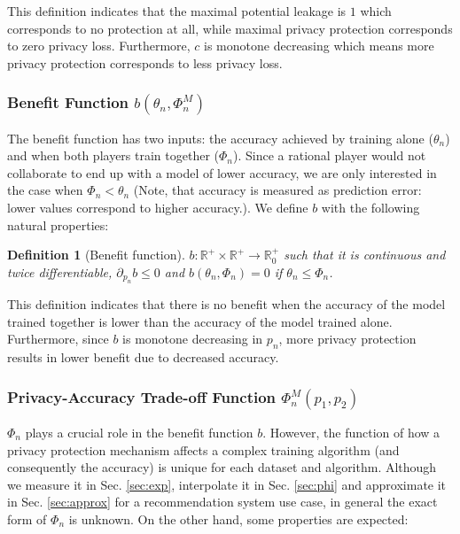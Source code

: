 \documentclass[USenglish,oneside,twocolumn]{article}
\theoremstyle{plain}
\newtheorem{definition}{Definition}
\begin{document}
    This definition indicates that the maximal potential leakage is $1$ which corresponds to no protection at all, while maximal privacy protection corresponds to zero privacy loss. Furthermore, $c$ is monotone decreasing which means more privacy protection corresponds to less privacy loss.
    
    \vspace{-0.5cm}
    \subsubsection{Benefit Function $b(\theta_n,\Phi_n^M)$}
    \vspace{-0.25cm}
    
    The benefit function has two inputs: the accuracy achieved by training alone ($\theta_n$) and when both players train together ($\Phi_n$). Since a rational player would not collaborate to end up with a model of lower accuracy, we are only interested in the case when $\Phi_n<\theta_n$ (Note, that accuracy is measured as prediction error: lower values correspond to higher accuracy.). We define $b$ with the following natural properties:
    
    \vspace{-0.25cm}
    \begin{definition}[Benefit function]
        \label{def:b}
        $b:\mathbb{R}^+\times\mathbb{R}^+\rightarrow\mathbb{R}_0^+$ such that it is continuous and twice differentiable, $\partial_{p_n}b\leq0$ and $b(\theta_n, \Phi_n)=0$ if $\theta_n\leq\Phi_n$.
    \end{definition}
    \vspace{-0.25cm}
    
    This definition indicates that there is no benefit when the accuracy of the model trained together is lower than the accuracy of the model trained alone. Furthermore, since $b$ is monotone decreasing in $p_n$, more privacy protection results in lower benefit due to decreased accuracy.
    
    \vspace{-0.5cm}
    \subsubsection{Privacy-Accuracy Trade-off Function $\Phi_n^M(p_1,p_2)$}
    \label{sec:acc}
    \vspace{-0.25cm}
    
    $\Phi_n$ plays a crucial role in the benefit function $b$. However, the function of how a privacy protection mechanism affects a complex training algorithm (and consequently the accuracy) is unique for each dataset and algorithm. Although we measure it in Sec. \ref{sec:exp}, interpolate it in Sec. \ref{sec:phi} and approximate it in Sec. \ref{sec:approx} for a recommendation system use case, in general the exact form of $\Phi_n$ is unknown. On the other hand, some properties are expected:
    
\end{document}
